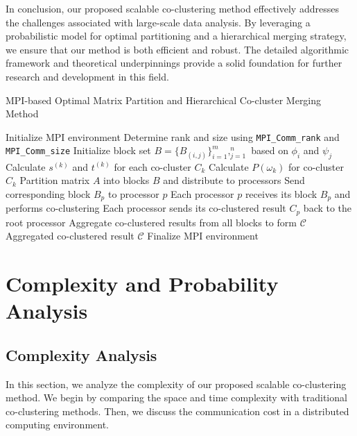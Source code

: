 \documentclass[journal]{IEEEtran}
\begin{document}
In conclusion, our proposed scalable co-clustering method effectively addresses the challenges associated with large-scale data analysis. By leveraging a probabilistic model for optimal partitioning and a hierarchical merging strategy, we ensure that our method is both efficient and robust. The detailed algorithmic framework and theoretical underpinnings provide a solid foundation for further research and development in this field.

\begin{algorithm}[!t]
  \caption{MPI-based Optimal Matrix Partition and Hierarchical Co-cluster Merging Method}\label{alg:mpi_method}
  \begin{algorithmic}[1]
    \STATE Initialize MPI environment
    \STATE Determine rank and size using \texttt{MPI\_Comm\_rank} and \texttt{MPI\_Comm\_size}
    \STATE Initialize block set $B = \{B_{(i,j)}\}_{i=1}^m,_{j=1}^n$ based on $\phi_i$ and $\psi_j$
    \STATE Calculate $s^{(k)}$ and $t^{(k)}$ for each co-cluster $C_k$
    \STATE Calculate $P(\omega_k)$ for co-cluster $C_k$
    \STATE Partition matrix $A$ into blocks $B$ and distribute to processors
    \STATE Send corresponding block $B_p$ to processor $p$
    \ENDFOR
    \ENDIF
    \ENDFOR
    \ENDIF
    \STATE Each processor $p$ receives its block $B_p$ and performs co-clustering
    \STATE Each processor sends its co-clustered result $C_p$ back to the root processor
    \STATE Aggregate co-clustered results from all blocks to form $\mathcal{C}$
    \RETURN Aggregated co-clustered result $\mathcal{C}$
    \ENDIF
    \STATE Finalize MPI environment
  \end{algorithmic}
\end{algorithm}

\section{Complexity and Probability Analysis}
\label{sec:analysis}

\subsection{Complexity Analysis}
\label{subsec:complexity}
In this section, we analyze the complexity of our proposed scalable co-clustering method. We begin by comparing the space and time complexity with traditional co-clustering methods. Then, we discuss the communication cost in a distributed computing environment.
\end{document}
